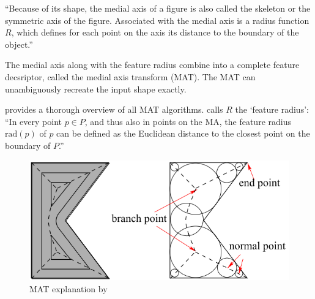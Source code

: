 ``Because of its shape, the medial axis of a figure is also called the skeleton or the symmetric axis of the figure.
Associated with the medial axis is a radius function $R$, which defines for each point on the axis its distance to the boundary of the object.''
\cite{lee1982medial}

The medial axis along with the feature radius combine into a complete feature decsriptor, called the medial axis transform (MAT).
The MAT can unambiguously recreate the input shape exactly. 

\cite{Moesen2011} provides a thorough overview of all MAT algorithms.
\cite{Moesen2011} calls $R$ the `feature radius': ``In every point $p \in P$, and thus also in points on the MA, the feature radius $\text{rad}(p)$ of $p$ can be defined as the Euclidean distance to the closest point on the boundary of $P$.''


\begin{figure}
\centering
\includegraphics[width=.9\columnwidth]{sources/intro/medial_axis_Kao.png}
\caption{MAT explanation by \citeauthor{kao1998optimal}}
\label{MAT_explanation}
\end{figure}


